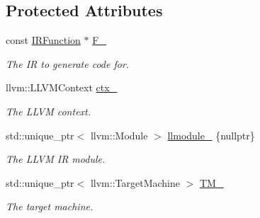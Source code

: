 \subsection*{Protected Attributes}
\begin{DoxyCompactItemize}
\item 
\mbox{\label{classglow_1_1_l_l_v_m_i_r_gen_a547b5f799b99850e524343291109ce9e}} 
const \hyperlink{classglow_1_1_i_r_function}{I\+R\+Function} $\ast$ \hyperlink{classglow_1_1_l_l_v_m_i_r_gen_a547b5f799b99850e524343291109ce9e}{F\+\_\+}
\begin{DoxyCompactList}\small\item\em The IR to generate code for. \end{DoxyCompactList}\item 
\mbox{\label{classglow_1_1_l_l_v_m_i_r_gen_a46408754b14d6dbd25bb4a907c357d90}} 
llvm\+::\+L\+L\+V\+M\+Context \hyperlink{classglow_1_1_l_l_v_m_i_r_gen_a46408754b14d6dbd25bb4a907c357d90}{ctx\+\_\+}
\begin{DoxyCompactList}\small\item\em The L\+L\+VM context. \end{DoxyCompactList}\item 
\mbox{\label{classglow_1_1_l_l_v_m_i_r_gen_ae752832d01214abc7e30a8e43901952a}} 
std\+::unique\+\_\+ptr$<$ llvm\+::\+Module $>$ \hyperlink{classglow_1_1_l_l_v_m_i_r_gen_ae752832d01214abc7e30a8e43901952a}{llmodule\+\_\+} \{nullptr\}
\begin{DoxyCompactList}\small\item\em The L\+L\+VM IR module. \end{DoxyCompactList}\item 
\mbox{\label{classglow_1_1_l_l_v_m_i_r_gen_a8b144416b9efb55ab1921850c0d2a187}} 
std\+::unique\+\_\+ptr$<$ llvm\+::\+Target\+Machine $>$ \hyperlink{classglow_1_1_l_l_v_m_i_r_gen_a8b144416b9efb55ab1921850c0d2a187}{T\+M\+\_\+}
\begin{DoxyCompactList}\small\item\em The target machine. \end{DoxyCompactList}\item 
\mbox{\label{classglow_1_1_l_l_v_m_i_r_gen_a2bdc48bcce7fee3857a461cea91d0743}} 

\end{DoxyCompactItemize}
